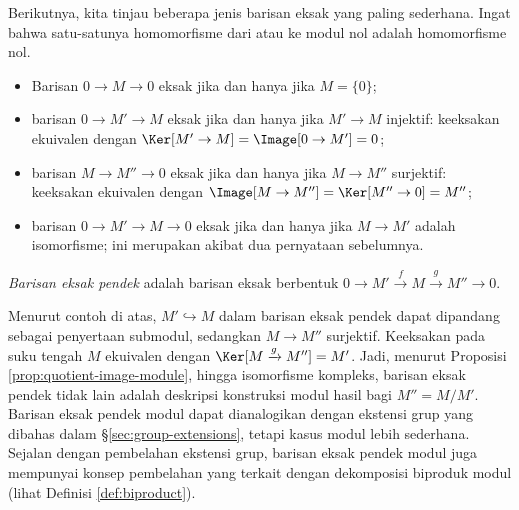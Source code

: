 Berikutnya, kita tinjau beberapa jenis barisan eksak yang paling sederhana. Ingat bahwa satu-satunya homomorfisme dari atau ke modul nol adalah homomorfisme nol.
\begin{itemize}
	\item Barisan $0 \to M \to 0$ eksak jika dan hanya jika $M = \{0\}$;
	\item barisan $0 \to M' \to M$ eksak jika dan hanya jika $M' \to M$ injektif: keeksakan ekuivalen dengan $\Ker[M' \to M] = \Image[0 \to M'] = 0$;
	\item barisan $M \to M'' \to 0$ eksak jika dan hanya jika $M \to M''$ surjektif: keeksakan ekuivalen dengan $\Image[M \to M''] = \Ker[M'' \to 0] = M''$;
	\item barisan $0 \to M' \to M \to 0$ eksak jika dan hanya jika $M \to M'$ adalah isomorfisme; ini merupakan akibat dua pernyataan sebelumnya.
\end{itemize}

\begin{definition}
	\emph{Barisan eksak pendek} adalah barisan eksak berbentuk $0 \to M' \xrightarrow{f} M \xrightarrow{g} M'' \to 0$.
\end{definition}
Menurut contoh di atas, $M' \hookrightarrow M$ dalam barisan eksak pendek dapat dipandang sebagai penyertaan submodul, sedangkan $M \to M''$ surjektif. Keeksakan pada suku tengah $M$ ekuivalen dengan $\Ker[M \xrightarrow{g} M''] = M'$. Jadi, menurut Proposisi \ref{prop:quotient-image-module}, hingga isomorfisme kompleks, barisan eksak pendek tidak lain adalah deskripsi konstruksi modul hasil bagi $M'' = M/M'$. Barisan eksak pendek modul dapat dianalogikan dengan ekstensi grup yang dibahas dalam \S\ref{sec:group-extensions}, tetapi kasus modul lebih sederhana. Sejalan dengan pembelahan ekstensi grup, barisan eksak pendek modul juga mempunyai konsep pembelahan yang terkait dengan dekomposisi biproduk modul (lihat Definisi \ref{def:biproduct}). 


